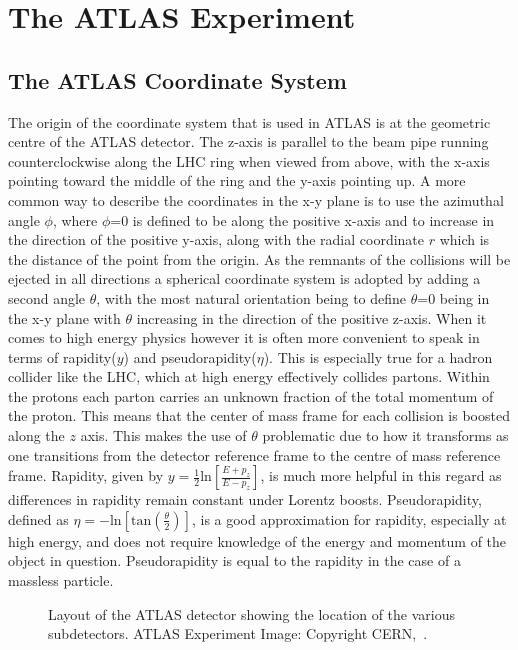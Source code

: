 \section{The ATLAS Experiment}
\label{Sec:ATLAS}

\subsection{The ATLAS Coordinate System}

The origin of the coordinate system that is used in ATLAS is at the geometric centre of the ATLAS detector.  
The z-axis is parallel to the beam pipe running counterclockwise along the LHC ring when viewed from above, with the x-axis pointing toward the middle of the ring and the y-axis pointing up.  
A more common way to describe the coordinates in the x-y plane is to use the azimuthal angle $\phi$, where $\phi$=0 is defined to be along the positive x-axis and to increase in the direction of the positive y-axis, along with the radial coordinate $r$ which is the distance of the point from the origin.  
As the remnants of the collisions will be ejected in all directions a spherical coordinate system is adopted by adding a second angle $\theta$, with the most natural orientation being to define $\theta$=0 being in the x-y plane with $\theta$ increasing in the direction of the positive z-axis.  
When it comes to high energy physics however it is often more convenient to speak in terms of rapidity($y$) and pseudorapidity($\eta$).  
This is especially true for a hadron collider like the LHC, which at high energy effectively collides partons.  
Within the protons each parton carries an unknown fraction of the total momentum of the proton.  
This means that the center of mass frame for each collision is boosted along the $z$ axis.  
This makes the use of $\theta$ problematic due to how it transforms as one transitions from the detector reference frame to the centre of mass reference frame.  
Rapidity, given by $y=\frac{1}{2}\mathrm{ln}\left[\frac{E+p_{z}}{E-p_z}\right]$, is much more helpful in this regard as differences in rapidity remain constant under Lorentz boosts.  
Pseudorapidity, defined as $\eta=-\mathrm{ln}\left[\mathrm{tan}\left(\frac{\theta}{2}\right)\right]$, is a good approximation for rapidity, especially at high energy, and does not require knowledge of the energy and momentum of the object in question.  
Pseudorapidity is equal to the rapidity in the case of a massless particle.  

\begin{figure}[!ht]
  \begin{center}
  \end{center}
  \caption[Layout of the ATLAS detector]
  {\small Layout of the ATLAS detector showing the location of the various subdetectors.  ATLAS Experiment Image: Copyright CERN,~\cite{Pequenao:1095924}.}
\end{figure}

